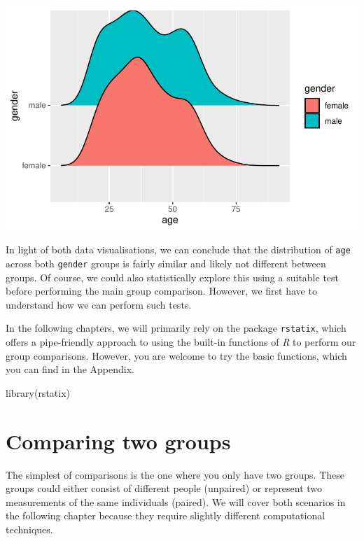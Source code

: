 \documentclass[
  letterpaper,
  DIV=11,
  numbers=noendperiod]{scrreprt}
\newenvironment{Shaded}{\begin{snugshade}}{\end{snugshade}}
\newcommand{\FunctionTok}[1]{\textcolor[rgb]{0.28,0.35,0.67}{#1}}
\newcommand{\NormalTok}[1]{\textcolor[rgb]{0.00,0.23,0.31}{#1}}
\begin{document}
\includegraphics{11_group_comparison_files/figure-pdf/comparability-of-egyptians-plot-1.pdf}

In light of both data visualisations, we can conclude that the
distribution of \texttt{age} across both \texttt{gender} groups is
fairly similar and likely not different between groups. Of course, we
could also statistically explore this using a suitable test before
performing the main group comparison. However, we first have to
understand how we can perform such tests.

In the following chapters, we will primarily rely on the package
\texttt{rstatix}, which offers a pipe-friendly approach to using the
built-in functions of \emph{R} to perform our group comparisons.
However, you are welcome to try the basic functions, which you can find
in the Appendix.

\begin{Shaded}
\begin{Highlighting}[]
\FunctionTok{library}\NormalTok{(rstatix)}
\end{Highlighting}
\end{Shaded}

\section{Comparing two groups}\label{sec-comparing-two-groups}

The simplest of comparisons is the one where you only have two groups.
These groups could either consist of different people (unpaired) or
represent two measurements of the same individuals (paired). We will
cover both scenarios in the following chapter because they require
slightly different computational techniques.
\end{document}
